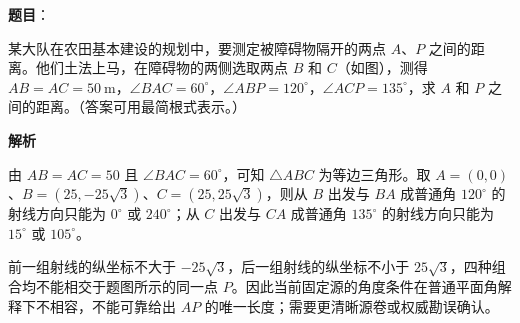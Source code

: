 \begin{answer}

\textbf{题目}：

某大队在农田基本建设的规划中，要测定被障碍物隔开的两点 $A\text{、}P$ 之间的距离。他们土法上马，在障碍物的两侧选取两点 $B$ 和 $C$（如图），测得 $AB=AC=50\ \mathrm m$，$\angle BAC=60^\circ$，$\angle ABP=120^\circ$，$\angle ACP=135^\circ$，求 $A$ 和 $P$ 之间的距离。（答案可用最简根式表示。）
\nopagebreak[4]
\begin{center}\end{center}
\nopagebreak[4]
\textbf{解析}

由 $AB=AC=50$ 且 $\angle BAC=60^\circ$，可知 $\triangle ABC$ 为等边三角形。取 $A=(0,0)$、$B=(25,-25\sqrt3)$、$C=(25,25\sqrt3)$，则从 $B$ 出发与 $BA$ 成普通角 $120^\circ$ 的射线方向只能为 $0^\circ$ 或 $240^\circ$；从 $C$ 出发与 $CA$ 成普通角 $135^\circ$ 的射线方向只能为 $15^\circ$ 或 $105^\circ$。

前一组射线的纵坐标不大于 $-25\sqrt3$，后一组射线的纵坐标不小于 $25\sqrt3$，四种组合均不能相交于题图所示的同一点 $P$。因此当前固定源的角度条件在普通平面角解释下不相容，不能可靠给出 $AP$ 的唯一长度；需要更清晰源卷或权威勘误确认。


\end{answer}